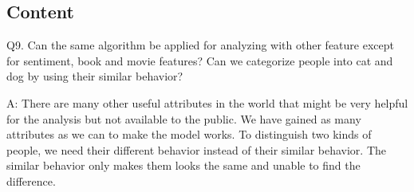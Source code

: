 \documentclass[12pt]{article}
\begin{document}
\subsection{Content}

Q9. Can the same algorithm be applied for analyzing with other feature except for sentiment, book and movie features? Can we categorize people into cat and dog by using their similar behavior?

A: There are many other useful attributes in the world that might be very helpful for the analysis but not available to the public. We have gained as many attributes as we can to make the model works. To distinguish two kinds of people, we need their different behavior instead of their similar behavior. The similar behavior only makes them looks the same and unable to find the difference.

\printbibliography
\end{document}
